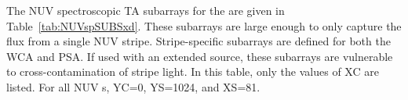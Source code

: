 
The NUV spectroscopic TA subarrays for the  are given in Table~\ref{tab:NUVspSUBSxd}.
These subarrays are large enough to only capture the flux from a single NUV stripe.
Stripe-specific subarrays are defined for both the WCA and PSA.
If used with an extended source, these subarrays are vulnerable to cross-contamination of stripe light. In this table, only the values of XC are listed.
For all NUV s, YC=0, YS=1024, and XS=81.

